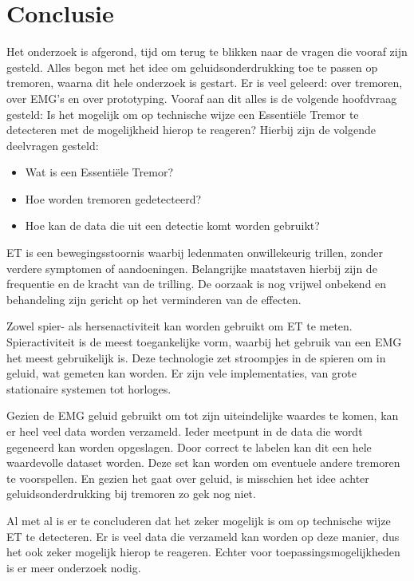 \section{Conclusie}
\label{section:conclusion}

Het onderzoek is afgerond,
tijd om terug te blikken naar de vragen die vooraf zijn gesteld.
Alles begon met het idee om geluidsonderdrukking toe te passen op tremoren,
waarna dit hele onderzoek is gestart.
Er is veel geleerd: over tremoren, over EMG's en over prototyping.
Vooraf aan dit alles is de volgende hoofdvraag gesteld:
Is het mogelijk om op technische wijze een Essentiële Tremor te detecteren met de mogelijkheid hierop te reageren?
Hierbij zijn de volgende deelvragen gesteld:

\begin{itemize}
    \item Wat is een Essentiële Tremor?
    \item Hoe worden tremoren gedetecteerd?
    \item Hoe kan de data die uit een detectie komt worden gebruikt?
\end{itemize}

ET is een bewegingsstoornis waarbij ledenmaten onwillekeurig trillen,
zonder verdere symptomen of aandoeningen. 
Belangrijke maatstaven hierbij zijn de frequentie en de kracht van de trilling.
De oorzaak is nog vrijwel onbekend en behandeling zijn gericht op het verminderen van de effecten.

Zowel spier- als hersenactiviteit kan worden gebruikt om ET te meten.
Spieractiviteit is de meest toegankelijke vorm, waarbij het gebruik van een EMG het meest gebruikelijk is.
Deze technologie zet stroompjes in de spieren om in geluid, wat gemeten kan worden.
Er zijn vele implementaties, van grote stationaire systemen tot horloges.

Gezien de EMG geluid gebruikt om tot zijn uiteindelijke waardes te komen,
kan er heel veel data worden verzameld. Ieder meetpunt in de data die wordt gegeneerd kan worden opgeslagen.
Door correct te labelen kan dit een hele waardevolle dataset worden.
Deze set kan worden om eventuele andere tremoren te voorspellen.
En gezien het gaat over geluid, is misschien het idee achter geluidsonderdrukking bij tremoren zo gek nog niet.

Al met al is er te concluderen dat het zeker mogelijk is om op technische wijze ET te detecteren.
Er is veel data die verzameld kan worden op deze manier, dus het ook zeker mogelijk hierop te reageren.
Echter voor toepassingsmogelijkheden is er meer onderzoek nodig.